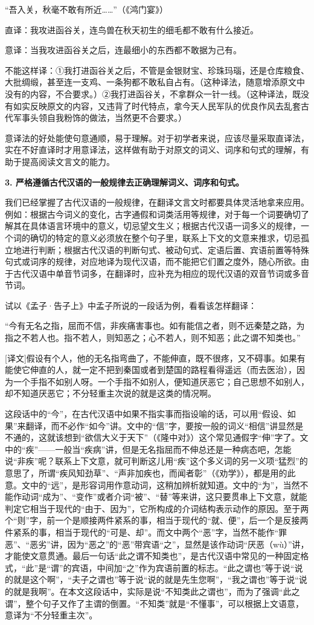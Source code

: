 “吾入关，秋毫不敢有所近……”（《鸿门宴》）

直译：我攻进函谷关，连鸟兽在秋天初生的细毛都不敢有什么接近。

意译：当我攻进函谷关之后，连最细小的东西都不敢据为己有。

不能这样译：①我打进函谷关之后，不管是金银财宝、珍珠玛瑙，还是仓库粮食、大批绸缎，甚至连一支鸡、一条狗都不敢私自占有。（这种译法，随意增添原文中没有的内容，不合要求。）②我打进函谷关，不拿群众一针一线。（这种译法，既没有如实反映原文的内容，又违背了时代特点，拿今天人民军队的优良作风去乱套古代军事头领自我粉饰的做法，当然更不合要求。）

意译法的好处能使句意通顺，易于理解。对于初学者来说，应该尽量采取直译法，实在不好直译时才用意译法，这样做有助于对原文的词义、词序和句式的理解，有助于提高阅读文言文的能力。

\textbf{3. 严格遵循古代汉语的一般规律去正确理解词义、词序和句式。}

我们已经掌握了古代汉语的一般规律，在翻译文言文时都要具体灵活地拿来应用。例如：根据古今词义的变化，古字通假和词类活用等规律，对于每一个词要确切了解其在具体语言环境中的意义，切忌望文生义；根据古代汉语一词多义的规律，一个词的确切的特定的意义必须放在整个句子里，联系上下文的文意来推求，切忌孤立地进行判断；根据古代汉语的判断句式、被动句式、定语后置、宾语前置等特殊句式或词序的规律，对应地译为现代汉语，而不能把它们置之度外，随心所欲。由于古代汉语中单音节词多，在翻译时，应补充为相应的现代汉语的双音节词或多音节词。

试以《孟子·告子上》中孟子所说的一段话为例，看看该怎样翻译：

“今有无名之指，屈而不信，非疾痛害事也。如有能信之者，则不远秦楚之路，为指之不若人也。指不若人，则知恶之；心不若人，则不知恶；此之谓不知类也。”

[译文]假设有个人，他的无名指弯曲了，不能伸直，既不很疼，又不碍事。如果有能使它伸直的人，就一定不把到秦国或者到楚国的路程看得遥远（而去医治），因为一个手指不如别人呀。一个手指不如别人，便知道厌恶它；自己思想不如别人，却不知道厌恶它；不分轻重主次说的就是这类的情况啊。

这段话中的“今”，在古代汉语中如果不指实事而指设喻的话，可以用“假设、如果”来翻译，而不必作“如今”讲。文中的“信”字，要按一般的词义“相信”讲显然是不通的，这就该想到“欲信大义于天下”（《隆中对》）这个常见通假字“伸”字了。文中的“疾”——一般当“疾病”讲，但是无名指屈而不伸总还是一种病态吧，怎能说“非疾”呢？联系上下文意，就可判断这儿用“疾”这个多义词的另一义项“猛烈”的意思了，所谓“疾风知劲草”、“声非加疾也，而闻者彰”（《劝学》），都是用的此意。文中的“远”，是形容词用作意动词，这稍加辨析就知道。文中的“为”，当然不能作动词“成为”、“变作”或者介词“被”、“替”等来讲，这只要贯串上下文意，就能判定它相当于现代的“由于、因为”，它所构成的介词结构表示动作的原因。至于两个“则”字，前一个是顺接两件紧系的事，相当于现代的“就、便”，后一个是反接两件紧系的事，相当于现代的“可是、却”。而文中两个“恶”字，当然不能作“罪恶”、“恶劣”讲，因为“恶之”的“恶”带宾语“之”，显然是该作动词“厌恶（wù）”讲，才能使文意贯通。最后一句话“此之谓不知类也”，是古代汉语中常见的一种固定格式，“此”是“谓”的宾语，中间加“之”作为宾语前置的标志。“此之谓也”等于说“说的就是这个啊”，“夫子之谓也”等于说“说的就是先生您啊”，“我之谓也”等于说“说的就是我啊”。在本文这段话中，实际是说“不知类此之谓也”，而为了强调“此之谓”，整个句子又作了主谓的倒置。“不知类”就是“不懂事”，可以根据上文语意，意译为“不分轻重主次”。

